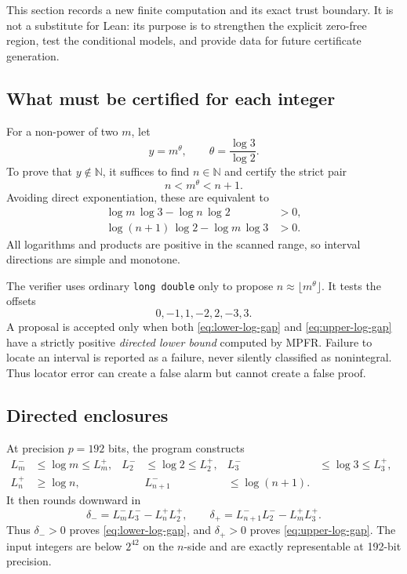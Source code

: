 \documentclass[11pt,oneside]{article}
\theoremstyle{definition}
\newcommand{\N}{\mathbb N}
\begin{document}
This section records a new finite computation and its exact trust boundary.  It is not a
substitute for Lean: its purpose is to strengthen the explicit zero-free region, test the
conditional models, and provide data for future certificate generation.

\subsection{What must be certified for each integer}

For a non-power of two \(m\), let
\[
  y=m^\theta,
  \qquad \theta=\frac{\log3}{\log2}.
\]
To prove that \(y\notin\N\), it suffices to find \(n\in\N\) and certify the strict pair
\[
  n<m^\theta<n+1.
\]
Avoiding direct exponentiation, these are equivalent to
\begin{align}
  \log m\,\log3-\log n\,\log2 &>0,
    \label{eq:lower-log-gap}\\
  \log(n+1)\,\log2-\log m\,\log3 &>0.
    \label{eq:upper-log-gap}
\end{align}
All logarithms and products are positive in the scanned range, so interval directions are
simple and monotone.

The verifier uses ordinary \texttt{long double} only to propose
\(n\approx\lfloor m^\theta\rfloor\).  It tests the offsets
\[
  0,-1,1,-2,2,-3,3.
\]
A proposal is accepted only when both \eqref{eq:lower-log-gap} and
\eqref{eq:upper-log-gap} have a strictly positive \emph{directed lower bound} computed by
MPFR.  Failure to locate an interval is reported as a failure, never silently classified as
nonintegral.  Thus locator error can create a false alarm but cannot create a false proof.

\subsection{Directed enclosures}

At precision \(p=192\) bits, the program constructs
\[
\begin{aligned}
  L_m^-&\le\log m\le L_m^+, &
  L_2^-&\le\log2\le L_2^+, &
  L_3^-&\le\log3\le L_3^+,\\
  L_n^+&\ge\log n, &&
  L_{n+1}^-&\le\log(n+1).&&
\end{aligned}
\]
It then rounds downward in
\[
  \delta_-=L_m^-L_3^- - L_n^+L_2^+,
  \qquad
  \delta_+=L_{n+1}^-L_2^- - L_m^+L_3^+.
\]
Thus \(\delta_->0\) proves \eqref{eq:lower-log-gap}, and \(\delta_+>0\) proves
\eqref{eq:upper-log-gap}.  The input integers are below \(2^{42}\) on the \(n\)-side and
are exactly representable at 192-bit precision.
\end{document}
